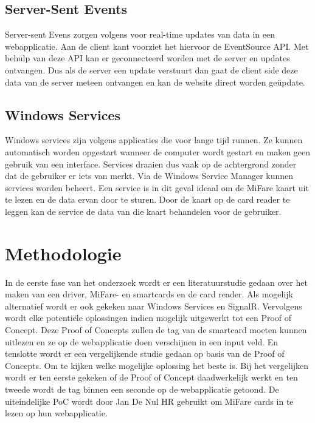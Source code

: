 \subsection{Server-Sent Events}
Server-sent Evens zorgen volgens \textcite{DigitalOceanSSE} voor real-time updates van data in een webapplicatie. Aan de client kant voorziet het hiervoor de EventSource API. Met behulp van deze API kan er geconnecteerd worden met de server en updates ontvangen. Dus als de server een update verstuurt dan gaat de client side deze data van de server meteen ontvangen en kan de website direct worden geüpdate.

\subsection{Windows Services}
Windows services zijn volgens \textcite{MicrosoftWS} applicaties die voor lange tijd runnen. Ze kunnen automatisch worden opgestart wanneer de computer wordt gestart en maken geen gebruik van een interface. Services draaien dus vaak op de achtergrond zonder dat de gebruiker er iets van merkt. Via de Windows Service Manager kunnen services worden beheert. Een service is in dit geval ideaal om de MiFare kaart uit te lezen en de data ervan door te sturen. Door de kaart op de card reader te leggen kan de service de data van die kaart behandelen voor de gebruiker.

\section{Methodologie}%
\label{sec:methodologie}

In de eerste fase van het onderzoek wordt er een literatuurstudie gedaan over het maken van een driver, MiFare- en smartcards en de card reader. Als mogelijk alternatief wordt er ook gekeken naar Windows Services en SignalR. Vervolgens wordt elke potentiële oplossingen indien mogelijk uitgewerkt tot een Proof of Concept. Deze Proof of Concepts zullen de tag van de smartcard moeten kunnen uitlezen en ze op de webapplicatie doen verschijnen in een input veld. En tenslotte wordt er een vergelijkende studie gedaan op basis van de Proof of Concepts. Om te kijken welke mogelijke oplossing het beste is. Bij het vergelijken wordt er ten eerste gekeken of de Proof of Concept daadwerkelijk werkt en ten tweede wordt de tag binnen een seconde op de webapplicatie getoond. De uiteindelijke PoC wordt door Jan De Nul HR gebruikt om MiFare cards in te lezen op hun webapplicatie. 

